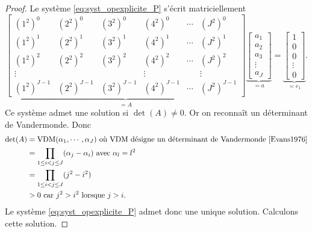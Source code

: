 \begin{proof}
Le système \eqref{eq:syst_opexplicite_P} s'écrit matriciellement
\begin{equation}
\underbrace{\begin{bmatrix}
(1^2)^0 & (2^2)^0 & (3^2)^0 & (4^2)^0 & \cdots & (J^2)^0\\
(1^2)^1 & (2^2)^1 & (3^2)^1 & (4^2)^1 & \cdots & (J^2)^1\\
(1^2)^2 & (2^2)^2 & (3^2)^2 & (4^2)^2 & \cdots & (J^2)^2\\
\vdots  &         &         & \vdots  &        &  \vdots\\
(1^2)^{J-1} & (2^2)^{J-1} & (3^2)^{J-1} & (4^2)^{J-1} & \cdots & (J^2)^{J-1}
\end{bmatrix}}_{= A}
\underbrace{\begin{bmatrix}
a_1 \\ a_2 \\ a_3 \\ \vdots \\ a_J
\end{bmatrix}
}_{=a} = \underbrace{\begin{bmatrix}
1 \\ 0 \\ 0 \\ \vdots \\ 0
\end{bmatrix}
}_{= e_1}.
\end{equation}
Ce système admet une solution si $\det (A) \neq 0$. Or on reconnaît un déterminant de Vandermonde. Donc
\begin{align*}
\det (A) & = \text{VDM}(\alpha_1 , \cdots, \alpha_J) \text{ où } \text{VDM} \text{ désigne un déterminant de Vandermonde \cite{Evans1976}} \\
	& = \displaystyle\prod\limits_{1\leq i < j \leq J} (\alpha_j - \alpha_i) \text{ avec } \alpha_l = l^2 \\
	& = \displaystyle\prod\limits_{1\leq i < j \leq J} (j^2 - i^2)\\
	& > 0 \text{ car } j^2 > i^2 \text{ lorsque } j>i.
\end{align*}
Le système \eqref{eq:syst_opexplicite_P} admet donc une unique solution. Calculons cette solution.


\end{proof}
